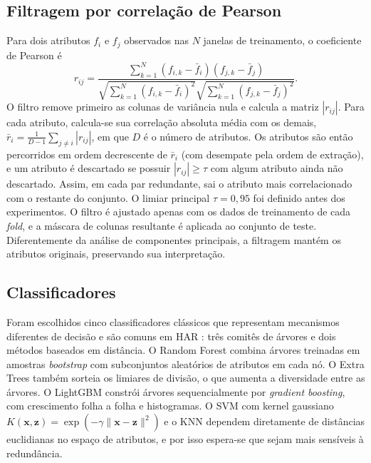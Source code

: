 \documentclass[conference]{IEEEtran}
\begin{document}
\subsection{Filtragem por correlação de Pearson}
Para dois atributos $f_i$ e $f_j$ observados nas $N$ janelas de treinamento, o coeficiente de Pearson é
\begin{equation}
r_{ij}=\frac{\sum_{k=1}^{N}(f_{i,k}-\bar f_i)(f_{j,k}-\bar f_j)}{\sqrt{\sum_{k=1}^{N}(f_{i,k}-\bar f_i)^2}\sqrt{\sum_{k=1}^{N}(f_{j,k}-\bar f_j)^2}}.
\label{eq:pearson}
\end{equation}
O filtro remove primeiro as colunas de variância nula e calcula a matriz $|r_{ij}|$. Para cada atributo, calcula-se sua correlação absoluta média com os demais, $\bar r_i=\frac{1}{D-1}\sum_{j\neq i}|r_{ij}|$, em que $D$ é o número de atributos. Os atributos são então percorridos em ordem decrescente de $\bar r_i$ (com desempate pela ordem de extração), e um atributo é descartado se possuir $|r_{ij}|\geq\tau$ com algum atributo ainda não descartado. Assim, em cada par redundante, sai o atributo mais correlacionado com o restante do conjunto. O limiar principal $\tau=0{,}95$ foi definido antes dos experimentos. O filtro é ajustado apenas com os dados de treinamento de cada \textit{fold}, e a máscara de colunas resultante é aplicada ao conjunto de teste. Diferentemente da análise de componentes principais, a filtragem mantém os atributos originais, preservando sua interpretação.

\subsection{Classificadores}
Foram escolhidos cinco classificadores clássicos que representam mecanismos diferentes de decisão e são comuns em HAR \cite{Lara2013,Kotsiantis2007}: três comitês de árvores e dois métodos baseados em distância. O Random Forest \cite{Breiman2001} combina árvores treinadas em amostras \textit{bootstrap} com subconjuntos aleatórios de atributos em cada nó. O Extra Trees \cite{Geurts2006} também sorteia os limiares de divisão, o que aumenta a diversidade entre as árvores. O LightGBM \cite{Ke2017} constrói árvores sequencialmente por \textit{gradient boosting}, com crescimento folha a folha e histogramas. O SVM \cite{Cortes1995} com kernel gaussiano $K(\mathbf{x},\mathbf{z})=\exp(-\gamma\|\mathbf{x}-\mathbf{z}\|^2)$ e o KNN \cite{Cover1967} dependem diretamente de distâncias euclidianas no espaço de atributos, e por isso espera-se que sejam mais sensíveis à redundância.
\end{document}
